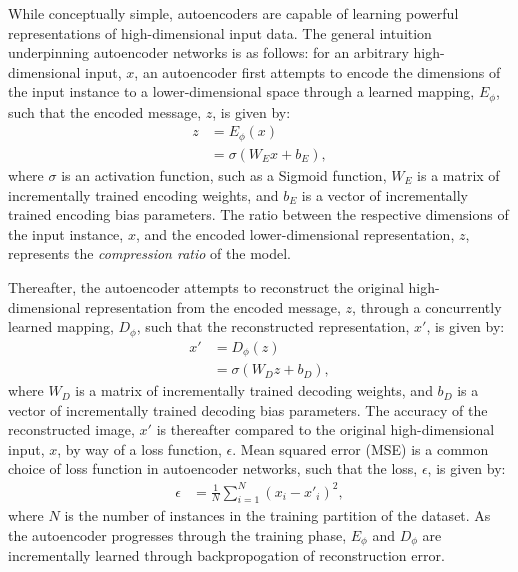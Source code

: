 
While conceptually simple, autoencoders are capable of learning powerful representations of high-dimensional input data. 
The general intuition underpinning autoencoder networks is as follows: for an arbitrary high-dimensional input, $x$, an autoencoder first attempts to encode the dimensions of the input instance to a lower-dimensional space through a learned mapping, $E_{\phi}$, such that the encoded message, $z$, is given by:
\begin{align}
	z 	&= E_{\phi}(x) \\
		&= \sigma(W_{E}x + b_{E}),
\end{align}
where $\sigma$ is an activation function, such as a Sigmoid function, $W_{E}$ is a matrix of incrementally trained encoding weights, and $b_{E}$ is a vector of incrementally trained encoding bias parameters.
The ratio between the respective dimensions of the input instance, $x$, and the encoded lower-dimensional representation, $z$, represents the \textit{compression ratio} of the model. 

Thereafter, the autoencoder attempts to reconstruct the original high-dimensional representation from the encoded message, $z$, through a concurrently learned mapping, $D_{\phi}$, such that the reconstructed representation, $x'$, is given by:
\begin{align}
	x' 	&= D_{\phi}(z)  \\
		&= \sigma(W_{D}z + b_{D}),
\end{align}
where $W_{D}$ is a matrix of incrementally trained decoding weights, and $b_{D}$ is a vector of incrementally trained decoding bias parameters.
The accuracy of the reconstructed image, $x'$ is thereafter compared to the original high-dimensional input, $x$, by way of a loss function, $\epsilon$. 
Mean squared error (MSE) is a common choice of loss function in autoencoder networks, such that the loss, $\epsilon$, is given by:
\begin{align}
	\epsilon 	&= \frac{1}{N}\sum^{N}_{i=1}(x_{i} - x'_{i})^2,
\end{align}
where $N$ is the number of instances in the training partition of the dataset. 
As the autoencoder progresses through the training phase, $E_{\phi}$ and $D_{\phi}$ are incrementally learned through backpropogation of reconstruction error.
